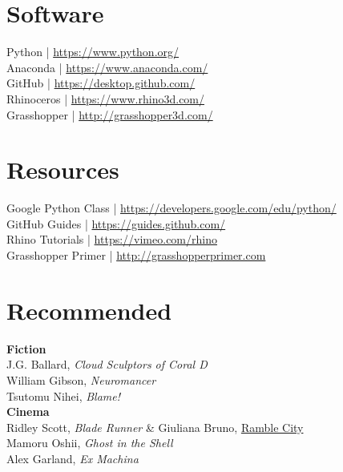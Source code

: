 \documentclass[11pt,article,oneside]{memoir}
\begin{document}
\clearpage

\section{Software}
\begin{multicols}{2}
\raggedright
Python | \url{https://www.python.org/}\\
Anaconda | \url{https://www.anaconda.com/}\\
GitHub | \url{https://desktop.github.com/}\\
Rhinoceros | \url{https://www.rhino3d.com/}\\
Grasshopper | \url{http://grasshopper3d.com/}\\
\end{multicols}

\section{Resources}
Google Python Class | \url{https://developers.google.com/edu/python/}\\
GitHub Guides | \url{https://guides.github.com/}\\
Rhino Tutorials | \url{https://vimeo.com/rhino}\\
Grasshopper Primer | \url{http://grasshopperprimer.com}\\

\section{Recommended}

\noindent \textbf{Fiction}\\
J.G. Ballard, \emph{Cloud Sculptors of Coral D}\\
William Gibson, \emph{Neuromancer}\\
Tsutomu Nihei, \emph{Blame!}\\

\noindent \textbf{Cinema}\\
Ridley Scott, \emph{Blade Runner}
\& Giuliana Bruno, \href{www.jstor.org/stable/778330}{Ramble City}\\
Mamoru Oshii, \emph{Ghost in the Shell}\\
Alex Garland, \emph{Ex Machina}\\
\end{document}
